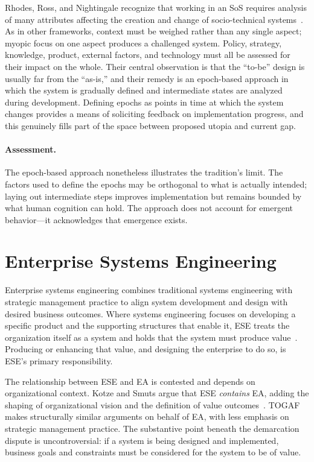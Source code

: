 \documentclass[11pt,a4paper]{article}
\begin{document}
Rhodes, Ross, and Nightingale recognize that working in an SoS requires analysis
of many attributes affecting the creation and change of socio-technical
systems~\citep{rhodes2009}. As in other frameworks, context must be weighed
rather than any single aspect; myopic focus on one aspect produces a challenged
system. Policy, strategy, knowledge, product, external factors, and technology
must all be assessed for their impact on the whole. Their central observation is
that the ``to-be'' design is usually far from the ``as-is,'' and their remedy is
an epoch-based approach in which the system is gradually defined and
intermediate states are analyzed during development. Defining epochs as points
in time at which the system changes provides a means of soliciting feedback on
implementation progress, and this genuinely fills part of the space between
proposed utopia and current gap.

\paragraph{Assessment.} The epoch-based approach nonetheless illustrates the
tradition's limit. The factors used to define the epochs may be orthogonal to
what is actually intended; laying out intermediate steps improves implementation
but remains bounded by what human cognition can hold. The approach does not
account for emergent behavior---it acknowledges that emergence exists.

\section{Enterprise Systems Engineering}
\label{sec:ese}

Enterprise systems engineering combines traditional systems engineering with
strategic management practice to align system development and design with
desired business outcomes. Where systems engineering focuses on developing a
specific product and the supporting structures that enable it, ESE treats the
organization itself as a system and holds that the system must produce
value~\citep{kotze2016}. Producing or enhancing that value, and designing the
enterprise to do so, is ESE's primary responsibility.

The relationship between ESE and EA is contested and depends on organizational
context. Kotze and Smuts argue that ESE \emph{contains} EA, adding the shaping
of organizational vision and the definition of value outcomes~\citep{kotze2016}.
TOGAF makes structurally similar arguments on behalf of EA, with less emphasis
on strategic management practice. The substantive point beneath the demarcation
dispute is uncontroversial: if a system is being designed and implemented,
business goals and constraints must be considered for the system to be of value.
\end{document}

